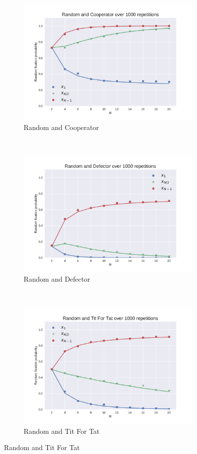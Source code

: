 \documentclass{article}
\begin{document}
\begin{figure}[!hbtp]
    \centering
    \begin{subfigure}[t]{.3\textwidth}
        \centering
        \includegraphics[width=.8\textwidth]{./img/Random_v_Cooperator.pdf}
        \caption{Random and Cooperator}
    \end{subfigure}%
    ~
    \begin{subfigure}[t]{.3\textwidth}
        \centering
        \includegraphics[width=.8\textwidth]{./img/Random_v_Defector.pdf}
        \caption{Random and Defector}
    \end{subfigure}%
    ~
    \begin{subfigure}[t]{.3\textwidth}
        \centering
        \includegraphics[width=.8\textwidth]{./img/Random_v_Tit_For_Tat.pdf}
        \caption{Random and Tit For Tat}
    \end{subfigure}%


\end{figure}
\end{document}
